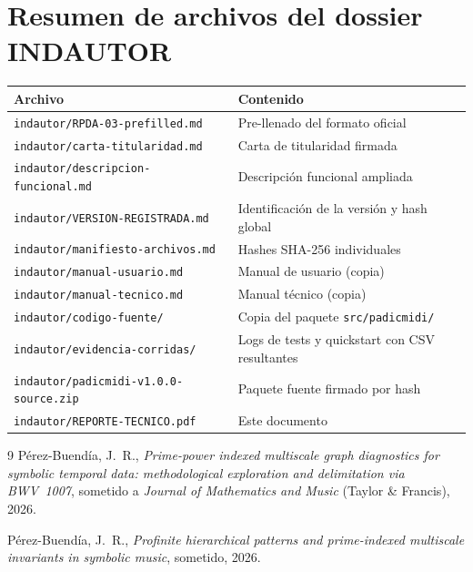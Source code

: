 \documentclass[11pt,a4paper,oneside]{article}
\theoremstyle{plain}
\theoremstyle{definition}
\theoremstyle{remark}
\newcommand{\code}[1]{\texttt{\small #1}}
\begin{document}
\section{Resumen de archivos del dossier INDAUTOR}\label{app:dossier}

\begin{tabularx}{\linewidth}{lX}
  \toprule
  \textbf{Archivo} & \textbf{Contenido} \\
  \midrule
  \code{indautor/RPDA-03-prefilled.md}     & Pre-llenado del formato oficial \\
  \code{indautor/carta-titularidad.md}     & Carta de titularidad firmada \\
  \code{indautor/descripcion-funcional.md} & Descripción funcional ampliada \\
  \code{indautor/VERSION-REGISTRADA.md}    & Identificación de la versión y hash global \\
  \code{indautor/manifiesto-archivos.md}   & Hashes SHA-256 individuales \\
  \code{indautor/manual-usuario.md}        & Manual de usuario (copia) \\
  \code{indautor/manual-tecnico.md}        & Manual técnico (copia) \\
  \code{indautor/codigo-fuente/}           & Copia del paquete \code{src/padicmidi/} \\
  \code{indautor/evidencia-corridas/}      & Logs de tests y quickstart con CSV resultantes \\
  \code{indautor/padicmidi-v1.0.0-source.zip} & Paquete fuente firmado por hash \\
  \code{indautor/REPORTE-TECNICO.pdf}      & Este documento \\
  \bottomrule
\end{tabularx}

\bigskip
\bigskip

\begin{thebibliography}{9}
  Pérez-Buendía, J.~R.,
  \emph{Prime-power indexed multiscale graph diagnostics for symbolic
  temporal data: methodological exploration and delimitation via
  BWV~1007}, sometido a \emph{Journal of Mathematics and Music}
  (Taylor \& Francis), 2026.

  Pérez-Buendía, J.~R.,
  \emph{Profinite hierarchical patterns and prime-indexed multiscale
  invariants in symbolic music}, sometido, 2026.
\end{thebibliography}
\end{document}
